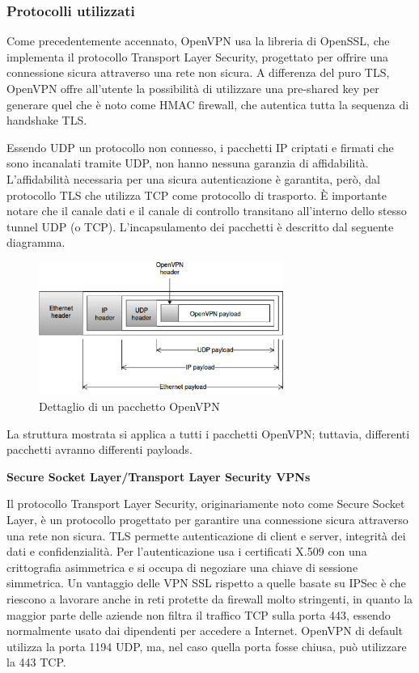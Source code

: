 \subsubsection{Protocolli utilizzati}
Come precedentemente accennato, OpenVPN usa la libreria di OpenSSL, che implementa il protocollo Transport Layer Security, progettato per offrire una connessione sicura attraverso una rete non sicura.
A differenza del puro TLS, OpenVPN offre all'utente la possibilità di utilizzare una pre-shared key per generare quel che è noto come HMAC firewall, che autentica tutta la sequenza di handshake TLS.

Essendo UDP un protocollo non connesso, i pacchetti IP criptati e firmati che sono incanalati tramite UDP, non hanno nessuna garanzia di affidabilità. L'affidabilità necessaria per una sicura autenticazione è garantita, però, dal protocollo TLS che utilizza TCP come protocollo di trasporto.
È importante notare che il canale dati e il canale di controllo transitano all'interno dello stesso tunnel UDP (o TCP). L'incapsulamento dei pacchetti è descritto dal seguente diagramma.

\begin{figure}
    \centering
    \includegraphics[width=8cm]{figure/OVPN_packet.png}
    \caption{Dettaglio di un pacchetto OpenVPN}
\end{figure}

La struttura mostrata si applica a tutti i pacchetti OpenVPN; tuttavia, differenti pacchetti avranno differenti payloads.


\noindent \textbf{Secure Socket Layer/Transport Layer Security VPNs}

Il protocollo Transport Layer Security, originariamente noto come Secure Socket Layer, è un protocollo progettato per garantire una connessione sicura attraverso una rete non sicura. TLS permette autenticazione di client e server, integrità dei dati e confidenzialità. Per l'autenticazione usa i certificati X.509 \cite[RFC5280]{RFC5280} con una crittografia asimmetrica e si occupa di negoziare una chiave di sessione simmetrica.
Un vantaggio delle VPN SSL rispetto a quelle basate su IPSec è che riescono a lavorare anche in reti protette da firewall molto stringenti, in quanto la maggior parte delle aziende non filtra il traffico TCP sulla porta 443, essendo normalmente usato dai dipendenti per accedere a Internet. OpenVPN di default utilizza la porta 1194 UDP, ma, nel caso quella porta fosse chiusa, può utilizzare la 443 TCP.


